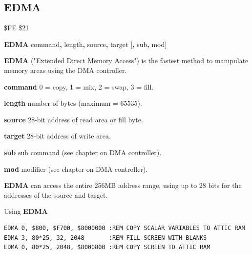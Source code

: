 \subsection{EDMA}
\label{BASIC 65 Commands!EDMA}
\begin{description}[leftmargin=2cm,style=nextline]
\item [Token:] \$FE \$21
\item [Format:] {\bf EDMA} command{\bf,} length{\bf,} source{\bf,}
                 target [{\bf,} sub{\bf,} mod]
\item [Usage:]
   {\bf EDMA} ("Extended Direct Memory Access") is the fastest method
   to manipulate memory areas using the DMA controller.

   {\bf command} 0 = copy, 1 = mix, 2 = swap, 3 = fill.

   {\bf length} number of bytes (maximum = 65535).

   {\bf source}  28-bit address of read area or fill byte.

   {\bf target} 28-bit address of write area.

   {\bf sub} sub command (see chapter on DMA controller).

   {\bf mod} modifier (see chapter on DMA controller).

\item [Remarks:]
{\bf EDMA} can access the entire 256MB address range,
using up to 28 bits for the addresses of the source and target.
\item [Examples:] Using {\bf EDMA}
\begin{tcolorbox}[colback=black,coltext=white]
\verbatimfont{\codefont}
\begin{verbatim}
EDMA 0, $800, $F700, $8000000 :REM COPY SCALAR VARIABLES TO ATTIC RAM
EDMA 3, 80*25, 32, 2048       :REM FILL SCREEN WITH BLANKS
EDMA 0, 80*25, 2048, $8000800 :REM COPY SCREEN TO ATTIC RAM
\end{verbatim}
\end{tcolorbox}
\end{description}


\newpage
